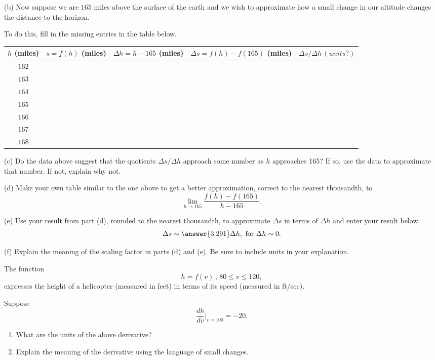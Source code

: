 \documentclass{ximera}
\begin{document}
\begin{question}
(b) Now suppose we are $165$ miles above the surface of the earth and we wish to approximate how a small change in our altitude changes the distance to the horizon.

To do this, fill in the missing entries in the table below.

\begin{center}
  \begin{tabular}{ | c| c | c | c | c |}
    \hline
    $h$ (miles) & $s = f(h)$ (miles) & $\Delta h = h-165$ (miles)  & $\Delta s =f(h) - f(165)$ (miles) & $\Delta s/\Delta h \, (units?)$ \\ \hline
     $162$ &  &  &   & \\ \hline
    $163$ &  &  &   & \\ \hline
    $164$ &  &  &   &  \\ \hline
    $165$  &  &  &  &   \\ \hline
    $166$ &  &  &   &  \\ \hline
    $167$ &  &  &   &  \\ \hline
    $168$ &  &  &   &  \\ \hline
    \hline
  \end{tabular}
\end{center}

(c) Do the data above suggest that the quotients $\Delta s / \Delta h$ approach some number as $h$ approaches 165? If so, use the data to approximate that number. If not, explain why not.

(d) Make your own table similar to the one above to get a better approximation, correct to the nearest thousandth, to
\[
   \lim_{h\to 165} \frac{f(h) - f(165)}{h-165} .
\]


(e) Use your result from part (d), rounded to the nearest thousandth, to approximate $\Delta s$ in terms of $\Delta h$ and enter your result below.
\[
  \Delta s \sim \answer{3.291} \Delta h , \text{ for } \Delta h \sim 0.
\] 

(f) Explain the meaning of the scaling factor in parts (d) and (e). Be sure to include units in your explanation.


\end{question}


\begin{question}  \label{Qdetrghhgfgd}
The function
\[
      h = f(v) \, , \, 80 \leq v \leq 120 ,
\]
expresses the height of a helicopter (measured in feet) in terms of its speed (measured in ft/sec).

Suppose
\[
   \frac{dh}{dv}\Big|_{v=100} = - 20 .
\] 

\begin{enumerate}
\item What are the units of the above derivative?

\item Explain the meaning of the derivative using the language of small changes.
\end{enumerate}

\end{question}
\end{document}
